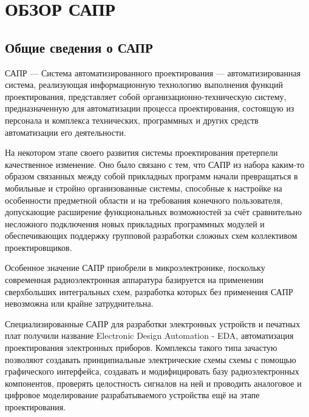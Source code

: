 \section{ОБЗОР САПР}
\subsection{Общие сведения о САПР}
\begin{par}
САПР --- Система автоматизированного проектирования --- автоматизированная система, реализующая
информационную технологию выполнения функций проектирования, представляет собой
организационно-техническую систему, предназначенную для автоматизации процесса проектирования,
состоящую из персонала и комплекса технических, программных и других средств
автоматизации его деятельности.
\end{par}

\begin{par}
На некотором этапе своего развития системы проектирования претерпели качественное изменение.
Оно было связано с тем, что САПР из набора каким-то образом связанных между собой прикладных
программ начали превращаться в мобильные и стройно организованные системы, способные к
настройке на особенности предметной области и на требования конечного пользователя,
допускающие расширение функциональных возможностей за счёт сравнительно несложного подключения
новых прикладных программных модулей и обеспечивающих поддержку групповой разработки сложных схем
коллективом проектировщиков.
\end{par}

\begin{par}
Особенное значение САПР приобрели в микроэлектронике, поскольку современная радиоэлектронная аппаратура базируется на применении сверхбольших интегральных схем, разработка которых без применения САПР невозможна или крайне затруднительна.
\end{par}

\begin{par}
Специализированные САПР для разработки электронных устройств и печатных плат получили название
Electronic Design Automation - EDA, автоматизация проектирования электронных приборов.
Комплексы такого типа зачастую позволяют создавать принципиальные электрические схемы схемы с
помощью графического интерфейса, создавать и модифицировать  базу радиоэлектронных компонентов,
проверять целостность сигналов на ней и проводить аналоговое и цифровое моделирование
разрабатываемого устройства ещё на этапе проектирования.
\end{par}


